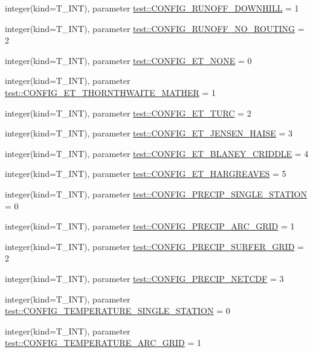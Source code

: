 \begin{DoxyCompactItemize}
\item 
integer(kind=T\_\-INT), parameter \hyperlink{namespacetest_a27b920f67f809bcc8d0cc06a9632d4f2}{test::CONFIG\_\-RUNOFF\_\-DOWNHILL} = 1
\item 
integer(kind=T\_\-INT), parameter \hyperlink{namespacetest_a53493938592d43a28a0b3efc51753e2d}{test::CONFIG\_\-RUNOFF\_\-NO\_\-ROUTING} = 2
\item 
integer(kind=T\_\-INT), parameter \hyperlink{namespacetest_aeaf62d9982d23ab73d24f5367a32aaf7}{test::CONFIG\_\-ET\_\-NONE} = 0
\item 
integer(kind=T\_\-INT), parameter \hyperlink{namespacetest_a10c79733bc37cb1c88dd6f84d08c2012}{test::CONFIG\_\-ET\_\-THORNTHWAITE\_\-MATHER} = 1
\item 
integer(kind=T\_\-INT), parameter \hyperlink{namespacetest_a9281ad856dadeb5f57137bd0e6219fa9}{test::CONFIG\_\-ET\_\-TURC} = 2
\item 
integer(kind=T\_\-INT), parameter \hyperlink{namespacetest_a2b90273702b4e7d130ec76d6e3eda6c7}{test::CONFIG\_\-ET\_\-JENSEN\_\-HAISE} = 3
\item 
integer(kind=T\_\-INT), parameter \hyperlink{namespacetest_a30e48e6d5352a9d7b9f80946248ac7c7}{test::CONFIG\_\-ET\_\-BLANEY\_\-CRIDDLE} = 4
\item 
integer(kind=T\_\-INT), parameter \hyperlink{namespacetest_a7eb680c826f6ef864ae366e97076e482}{test::CONFIG\_\-ET\_\-HARGREAVES} = 5
\item 
integer(kind=T\_\-INT), parameter \hyperlink{namespacetest_a21c652de204eff57b4a764e644f1c2d6}{test::CONFIG\_\-PRECIP\_\-SINGLE\_\-STATION} = 0
\item 
integer(kind=T\_\-INT), parameter \hyperlink{namespacetest_a2b72dfa965e7c91b8b844dfda4430890}{test::CONFIG\_\-PRECIP\_\-ARC\_\-GRID} = 1
\item 
integer(kind=T\_\-INT), parameter \hyperlink{namespacetest_a5cd862c804720044203e177379939919}{test::CONFIG\_\-PRECIP\_\-SURFER\_\-GRID} = 2
\item 
integer(kind=T\_\-INT), parameter \hyperlink{namespacetest_aabfd0fd8168bc7f0d7a8e12b40776c4e}{test::CONFIG\_\-PRECIP\_\-NETCDF} = 3
\item 
integer(kind=T\_\-INT), parameter \hyperlink{namespacetest_ae5b28f5f9060952cfc4b6dd836f27bb1}{test::CONFIG\_\-TEMPERATURE\_\-SINGLE\_\-STATION} = 0
\item 
integer(kind=T\_\-INT), parameter \hyperlink{namespacetest_a608c6b33ac0a09611c41b079eb5a4608}{test::CONFIG\_\-TEMPERATURE\_\-ARC\_\-GRID} = 1
\item 

\end{DoxyCompactItemize}
